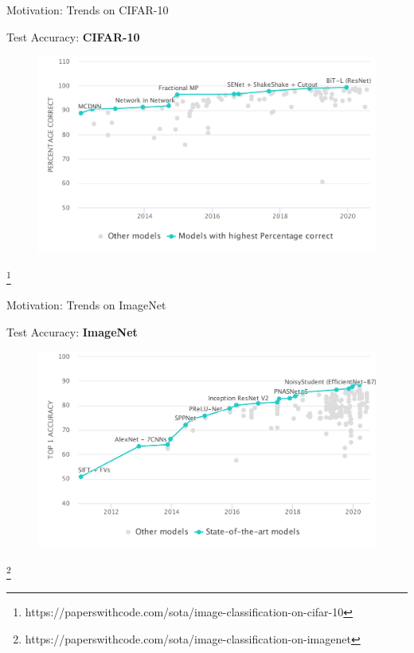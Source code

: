 \documentclass[mathserif,notheorems, hyperref={colorlinks, citecolor=blue, urlcolor=blue, linkcolor=blue}]{beamer}
\newcommand{\source}[1]{{\let\thefootnote\relax\footnote{{\tiny #1}}}}
\begin{document}
    \begin{frame}{Motivation: Trends on CIFAR-10} 
        \begin{center}
            \Large Test Accuracy: \textbf{CIFAR-10}
        \end{center}

        \begin{figure}[]
            \centering
            \includegraphics[width=\linewidth]{figures/Cifar10}
        \end{figure} 

        \source{https://paperswithcode.com/sota/image-classification-on-cifar-10}
    \end{frame}

    \begin{frame}{Motivation: Trends on ImageNet} 
        \begin{center}
            \Large Test Accuracy: \textbf{ImageNet}
        \end{center}

        \begin{figure}[]
            \centering
            \includegraphics[width=\linewidth]{figures/ImageNet}
        \end{figure} 

        \source{https://paperswithcode.com/sota/image-classification-on-imagenet}
    \end{frame}
\end{document}
